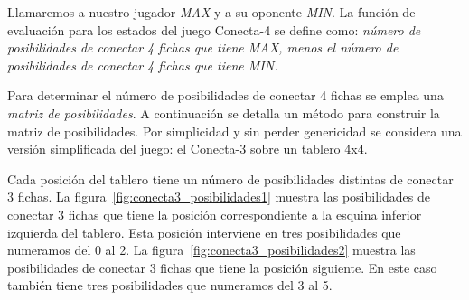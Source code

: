 Llamaremos a nuestro jugador \textit{MAX} y a su oponente \textit{MIN}.
La función de evaluación para los estados del juego Conecta-4 se define como:
\emph{número de posibilidades de conectar 4 fichas que tiene \textit{MAX}, menos el número de posibilidades de conectar 4 fichas que tiene \textit{MIN}.}

Para determinar el número de posibilidades de conectar 4 fichas se emplea una \textit{matriz de posibilidades}.
A continuación se detalla un método para construir la matriz de posibilidades.
Por simplicidad y sin perder genericidad se considera una versión simplificada del juego: el Conecta-3 sobre un tablero 4x4.

Cada posición del tablero tiene un número de posibilidades distintas de conectar 3 fichas.
La figura~\ref{fig:conecta3_posibilidades1} muestra las posibilidades de conectar 3 fichas que tiene la posición correspondiente a la esquina inferior izquierda del tablero.
Esta posición interviene en tres posibilidades que numeramos del 0 al 2.
La figura~\ref{fig:conecta3_posibilidades2} muestra las posibilidades de conectar 3 fichas que tiene la posición siguiente.
En este caso también tiene tres posibilidades que numeramos del 3 al 5.

